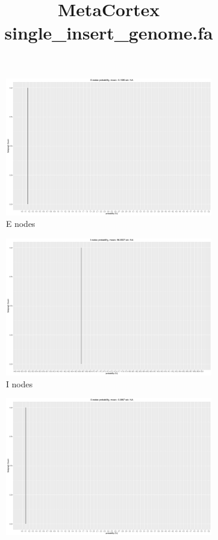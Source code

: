 \documentclass[a4paper, 12pt, oneside]{article}
\title{\large{MetaCortex single_insert_genome.fa}}
\begin{document}
\maketitle

\begin{figure}[h]
\centering
\begin{subfigure}[b]{0.45\textwidth}
\includegraphics[width=\textwidth]{graphs/E_degrees.png}
\caption{\label{fig:E}E nodes}
\end{subfigure}
\begin{subfigure}[b]{0.45\textwidth}
\includegraphics[width=\textwidth]{graphs/I_degrees.png}
\caption{\label{fig:I}I nodes }
\end{subfigure}
\begin{subfigure}[b]{0.45\textwidth}
\includegraphics[width=\textwidth]{graphs/X_degrees.png}

\end{subfigure}
\end{figure}
\end{document}
